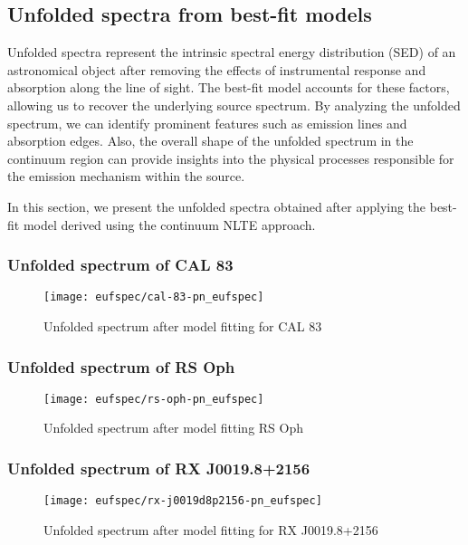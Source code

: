		\newpage
		\subsection{Unfolded spectra from best-fit models}
			Unfolded spectra represent the intrinsic spectral energy distribution (SED) of an astronomical object after removing the effects of instrumental response and absorption along the line of sight. The best-fit model accounts for these factors, allowing us to recover the underlying source spectrum. By analyzing the unfolded spectrum, we can identify prominent features such as emission lines and absorption edges. Also, the overall shape of the unfolded spectrum in the continuum region can provide insights into the physical processes responsible for the emission mechanism within the source.
			
			In this section, we present the unfolded spectra obtained after applying the best-fit model derived using the continuum NLTE approach.
		
			\subsubsection*{Unfolded spectrum of CAL 83}
				\begin{figure}[h!]
					\centering
					\texttt{[image: eufspec/cal-83-pn\_eufspec]}
					\caption{Unfolded spectrum after model fitting for CAL 83}
					\label{result:euf-cal-83}
				\end{figure}
			
			\subsubsection*{Unfolded spectrum of RS Oph}
				\begin{figure}[h!]
					\centering
					\texttt{[image: eufspec/rs-oph-pn\_eufspec]}
					\caption{Unfolded spectrum after model fitting RS Oph}
					\label{result:euf-rs-oph}
				\end{figure}
			
			\subsubsection*{Unfolded spectrum of RX J0019.8+2156}
				\begin{figure}[h!]
					\centering
					\texttt{[image: eufspec/rx-j0019d8p2156-pn\_eufspec]}
					\caption{Unfolded spectrum after model fitting for RX J0019.8+2156}
					\label{result:euf-rx-j0019}
				\end{figure}
			
